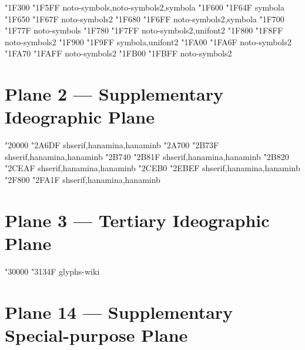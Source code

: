 \documentclass{article}
\begin{document}
              { "1F300} { "1F5FF} {noto-symbols,noto-symbols2,symbola}
                                          { "1F600} { "1F64F} {symbola}
                                { "1F650} { "1F67F} {noto-symbols2}
                          { "1F680} { "1F6FF} {noto-symbols2,symbola}
                                 { "1F700} { "1F77F} {noto-symbols}
                          { "1F780} { "1F7FF} {noto-symbols2,unifont2}
                              { "1F800} { "1F8FF} {noto-symbols2}
               { "1F900} { "1F9FF} {symbola,unifont2}
                                      { "1FA00} { "1FA6F} {noto-symbols2}
                 { "1FA70} { "1FAFF} {noto-symbols2}
                       { "1FB00} { "1FBFF} {noto-symbols2}

\section{Plane 2 --- Supplementary Ideographic Plane}

                 { "20000} { "2A6DF} {shserif,hanamina,hanaminb}
                 { "2A700} { "2B73F} {shserif,hanamina,hanaminb}
                 { "2B740} { "2B81F} {shserif,hanamina,hanaminb}
                 { "2B820} { "2CEAF} {shserif,hanamina,hanaminb}
                 { "2CEB0} { "2EBEF} {shserif,hanamina,hanaminb}
            { "2F800} { "2FA1F} {shserif,hanamina,hanaminb}

\section{Plane 3 --- Tertiary Ideographic Plane}

                 { "30000} { "3134F} {glyphs-wiki}

\section{Plane 14 --- Supplementary Special-purpose Plane}
\end{document}
